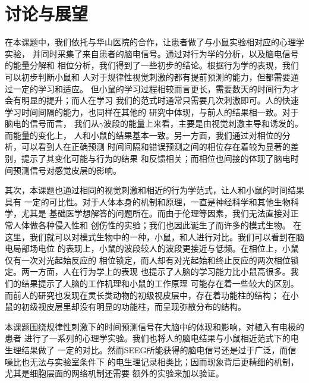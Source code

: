 \chapter{讨论与展望}

在本课题中，我们依托与华山医院的合作，让患者做了与小鼠实验相对应的心理学实验，
并同时采集了来自患者的脑电信号。通过对行为学的分析，以及脑电信号的能量分解和
相位分析，我们得到了一些初步的结论。根据行为学的表现，我们可以初步判断小鼠和
人对于规律性视觉刺激的都有提前预测的能力，但都需要通过一定的学习和适应。
但小鼠的学习过程相较而言更长，需要数天的时间行为才会有明显的提升；而人在学习
我们的范式时通常只需要几次刺激即可。人的快速学习时间间隔的能力，也同样在其他的
研究中体现，与前人的结果相一致\cite{simen2011model}。对于脑电的信号而言，
我们从\(\gamma\)波段的能量上来看，主要是由视觉刺激主导和诱发的。而能量的变化上，
人和小鼠的结果基本一致。另一方面，我们通过对相位的分析，可以看到人在正确预测
时间间隔和错误预测之间的相位存在着较为显著的差别，提示了其变化可能与行为的结果
和反馈相关；而相位也间接的体现了脑电时间预测信号对感觉皮层的影响。

其次，本课题也通过相同的视觉刺激和相近的行为学范式，让人和小鼠的时间结果具有
一定的可比性。对于人体本身的机制和原理，一直是神经科学和其他生物科学，尤其是
基础医学想解答的问题所在。而由于伦理等因素，我们无法直接对正常人体做各种侵入性和
创伤性的实验；我们也因此诞生了而许多的模式生物。
在这里，我们就可以对模式生物中的一种，小鼠，和人进行对比。我们可以看到在脑电局部场电位
的表现上，小鼠的波段较人的波段更接近与低频。在相位上，小鼠仅有一次对光起始反应的
相位锁定，而人却有对光起始和终止反应的两次相位锁定。两一方面，人在行为学上的表现
也提示了人脑的学习能力比小鼠高很多。我们的结果提示了人脑的工作机理和小鼠的工作原理
可能存在着一些较大的区别。
而前人的研究也发现在灵长类动物的初级视皮层中，存在着功能柱的结构；
在小鼠的初级视皮层里却没有明显的功能柱，而呈现弥散分布的结构。

本课题围绕规律性刺激下的时间预测信号在大脑中的体现和影响，对植入有电极的患者
进行了一系列的心理学实验。我们也将人的脑电结果与小鼠相近范式下的电生理结果做了
一定的对比。然而SEEG所能获得的脑电信号还是过于广泛，而信噪比也无法与实验室条件下
的电生理记录相类比；因而现象背后更精细的机制，尤其是细胞层面的网络机制还需要
额外的实验来加以验证。
